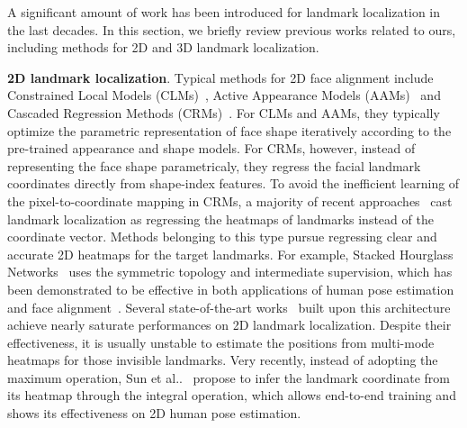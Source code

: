 \documentclass[a4paper,conference]{IEEEtran}
\makeatletter
\DeclareRobustCommand\onedot{\futurelet\@let@token\@onedot}
\def\@onedot{\ifx\@let@token.\else.\null\fi\xspace}
\def\etal{{et al}\onedot}
\makeatother
\begin{document}
A significant amount of work has been introduced for landmark localization in the last decades.
In this section, we briefly review previous works related to ours, including methods for 2D and 3D landmark localization.

{\bf 2D landmark localization}. 
Typical methods for 2D face alignment include Constrained Local Models (CLMs)~\cite{cristinacce2006feature,saragih2011deformable,yu2013pose}, Active Appearance Models (AAMs)~\cite{cootes2001active,matthews2004active} and Cascaded Regression Methods (CRMs)~\cite{cao2014face,xiong2013supervised,ren2014face}. 
For CLMs and AAMs, they typically optimize the parametric representation of face shape iteratively according to the pre-trained appearance and shape models.
For CRMs, however, instead of representing the face shape parametricaly, they regress the facial landmark coordinates directly from shape-index features.
To avoid the inefficient learning of the pixel-to-coordinate mapping in CRMs, a majority of recent approaches~\cite{newell2016stacked,bulat2016convolutional,Bulat2017HowFar} cast landmark localization as regressing the heatmaps of landmarks instead of the coordinate vector.
Methods belonging to this type pursue regressing clear and accurate 2D heatmaps for the target landmarks.
For example, Stacked Hourglass Networks~\cite{newell2016stacked} uses the symmetric topology and intermediate supervision,
which has been demonstrated to be effective in both applications of human pose estimation~\cite{newell2016stacked} and face alignment~\cite{Bulat2017HowFar}.
Several state-of-the-art works~\cite{yang2017ed,Bulat2017HowFar,chu2017multi} built upon this architecture achieve nearly saturate performances on 2D landmark localization.
Despite their effectiveness, it is usually unstable to estimate the positions from multi-mode heatmaps for those invisible landmarks.
Very recently, instead of adopting the maximum operation, Sun \etal~\cite{sun2017integral} propose to infer the landmark coordinate from its heatmap through the integral operation, which allows end-to-end training and shows its effectiveness on 2D human pose estimation.
\end{document}

